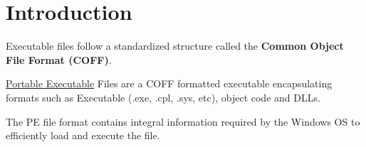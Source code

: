 \section{Introduction}


Executable files follow a standardized structure called the {\bf Common Object File Format (COFF)}.

\href{https://learn.microsoft.com/en-us/windows/win32/debug/pe-format}{Portable Executable} Files are a COFF formatted executable encapsulating formats such as Executable (.exe, .cpl, .sys, etc), object code and DLLs. 

The PE file format contains integral information required by the Windows OS to efficiently load and execute the file.  
